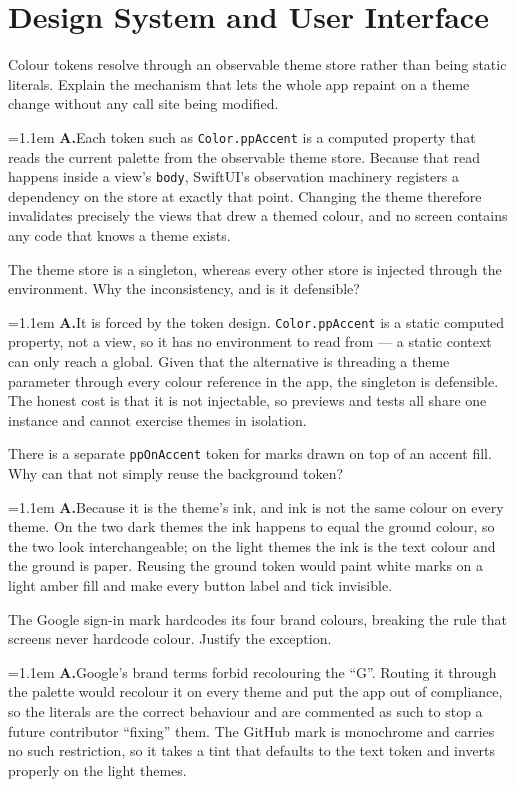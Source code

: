 \documentclass[11pt,a4paper]{article}
\newcommand{\code}[1]{\texttt{\small #1}}
\newcommand{\ans}[1]{%
  \par\vspace{0.32em}%
  \begingroup
  \small\color{answerink}%
  \leftskip=1.1em
  \noindent\textbf{\color{accent}A.}\hspace{0.45em}#1\par
  \endgroup
  \vspace{0.1em}%
}
\begin{document}
\section{Design System and User Interface}
\begin{questions}[resume]

\item Colour tokens resolve through an observable theme store rather than being
static literals. Explain the mechanism that lets the whole app repaint on a theme
change without any call site being modified.
\ans{Each token such as \code{Color.ppAccent} is a computed property that reads
the current palette from the observable theme store. Because that read happens
inside a view's \code{body}, SwiftUI's observation machinery registers a
dependency on the store at exactly that point. Changing the theme therefore
invalidates precisely the views that drew a themed colour, and no screen contains
any code that knows a theme exists.}

\item The theme store is a singleton, whereas every other store is injected
through the environment. Why the inconsistency, and is it defensible?
\ans{It is forced by the token design. \code{Color.ppAccent} is a static computed
property, not a view, so it has no environment to read from --- a static context
can only reach a global. Given that the alternative is threading a theme
parameter through every colour reference in the app, the singleton is defensible.
The honest cost is that it is not injectable, so previews and tests all share one
instance and cannot exercise themes in isolation.}

\item There is a separate \code{ppOnAccent} token for marks drawn on top of an
accent fill. Why can that not simply reuse the background token?
\ans{Because it is the theme's ink, and ink is not the same colour on every
theme. On the two dark themes the ink happens to equal the ground colour, so the
two look interchangeable; on the light themes the ink is the text colour and the
ground is paper. Reusing the ground token would paint white marks on a light
amber fill and make every button label and tick invisible.}

\item The Google sign-in mark hardcodes its four brand colours, breaking the rule
that screens never hardcode colour. Justify the exception.
\ans{Google's brand terms forbid recolouring the ``G''. Routing it through the
palette would recolour it on every theme and put the app out of compliance, so
the literals are the correct behaviour and are commented as such to stop a future
contributor ``fixing'' them. The GitHub mark is monochrome and carries no such
restriction, so it takes a tint that defaults to the text token and inverts
properly on the light themes.}


\end{questions}
\end{document}
